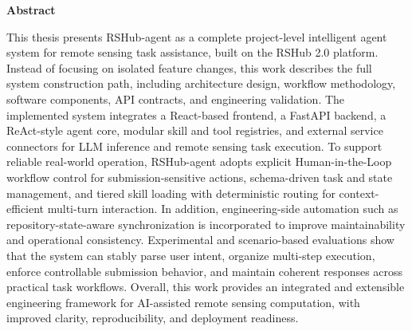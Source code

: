 \centerline{\xiaoyi\bfseries Abstract}
\vspace{2em}

\noindent
{}
{\fontsize{12pt}{14pt}\selectfont
	This thesis presents RSHub-agent as a complete project-level intelligent agent system for remote sensing task assistance, built on the RSHub 2.0 platform. Instead of focusing on isolated feature changes, this work describes the full system construction path, including architecture design, workflow methodology, software components, API contracts, and engineering validation. The implemented system integrates a React-based frontend, a FastAPI backend, a ReAct-style agent core, modular skill and tool registries, and external service connectors for LLM inference and remote sensing task execution. To support reliable real-world operation, RSHub-agent adopts explicit Human-in-the-Loop workflow control for submission-sensitive actions, schema-driven task and state management, and tiered skill loading with deterministic routing for context-efficient multi-turn interaction. In addition, engineering-side automation such as repository-state-aware synchronization is incorporated to improve maintainability and operational consistency. Experimental and scenario-based evaluations show that the system can stably parse user intent, organize multi-step execution, enforce controllable submission behavior, and maintain coherent responses across practical task workflows. Overall, this work provides an integrated and extensible engineering framework for AI-assisted remote sensing computation, with improved clarity, reproducibility, and deployment readiness.
	}